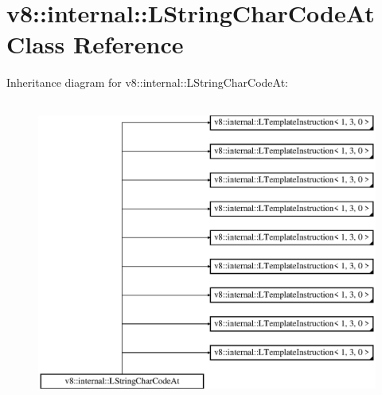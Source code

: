 \hypertarget{classv8_1_1internal_1_1_l_string_char_code_at}{}\section{v8\+:\+:internal\+:\+:L\+String\+Char\+Code\+At Class Reference}
\label{classv8_1_1internal_1_1_l_string_char_code_at}
Inheritance diagram for v8\+:\+:internal\+:\+:L\+String\+Char\+Code\+At\+:\begin{figure}[H]
\begin{center}
\leavevmode
\includegraphics[height=10.000000cm]{classv8_1_1internal_1_1_l_string_char_code_at}
\end{center}
\end{figure}

